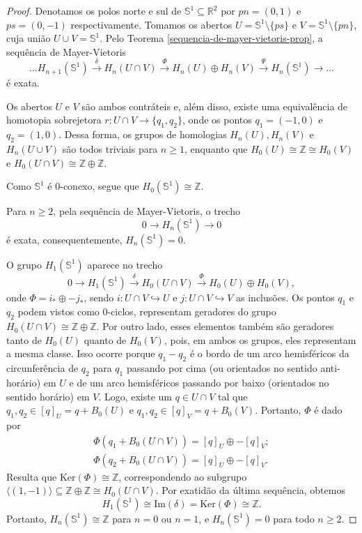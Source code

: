\begin{proof}
    Denotamos os polos norte e sul de $\mathbb{S}^1\subseteq \mathbb{R}^2$ por $pn=(0,1)$ e $ps=(0,-1)$ respectivamente. Tomamos os abertos $U=\mathbb{S}^1\setminus \{ps\}$ e $V=\mathbb{S}^1\setminus \{pn\}$, cuja união $U\cup V=\mathbb{S}^1$. Pelo Teorema \ref{sequencia-de-mayer-vietoris-prop}, a sequência de Mayer-Vietoris
    \[...H_{n+1}(\mathbb{S}^1)\xrightarrow{\delta} H_n(U\cap V)\xrightarrow{\Phi}H_n(U)\oplus H_n(V)\xrightarrow{\Psi} H_n(\mathbb{S}^1)\rightarrow ...\]
    é exata.

    Os abertos $U$ e $V$ são ambos contráteis e, além disso, existe uma equivalência de homotopia sobrejetora $r:U\cap V\rightarrow\{q_1,q_2\}$, onde os pontos $q_1=(-1,0)$ e $q_2=(1,0)$. Dessa forma, os grupos de homologias $H_n(U),H_n(V)$ e $H_n(U\cup V)$ são todos triviais para $n\ge 1$, enquanto que $H_0(U)\cong \mathbb{Z}\cong H_0 (V)$ e $H_0 (U\cap V)\cong \mathbb{Z}\oplus \mathbb{Z}$.

    Como $\mathbb{S}^1$ é 0-conexo, segue que $H_0(\mathbb{S}^1)\cong \mathbb{Z}$.

    Para $n\ge 2$, pela sequência de Mayer-Vietoris, o trecho  
    \[0\rightarrow H_n (\mathbb{S}^1)\rightarrow 0\]
    é exata, consequentemente, $H_n(\mathbb{S}^1)=0.$

    O grupo $H_1(\mathbb{S}^1)$ aparece no trecho 
    \[0\rightarrow H_1(\mathbb{S}^1)\xrightarrow{\delta} H_0 (U\cap V)\xrightarrow{\Phi} H_0(U)\oplus H_0 (V),\]
    onde $\Phi=i_*\oplus -j_*$, sendo $i:U\cap V\hookrightarrow U$ e $j:U\cap V\hookrightarrow V$ as inclusões. Os pontos $q_1$ e $q_2$ podem vistos como 0-ciclos, representam geradores do grupo $H_0(U\cap V)\cong \mathbb{Z}\oplus \mathbb{Z}$. Por outro lado, esses elementos também são geradores tanto de $H_0 (U)$ quanto de $H_0(V)$, pois, em ambos os grupos, eles representam a mesma classe. Isso ocorre porque $q_1-q_2$ é o bordo de um arco hemisféricos da circunferência de $q_2$ para $q_1$ passando por cima (ou orientados no sentido anti-horário) em $U$ e de um arco hemisféricos passando por baixo (orientados no sentido horário) em $V$. Logo, existe um $q\in U\cap V$ tal que $q_1,q_2\in [q]_U=q+B_0 (U)$ e $q_1,q_2\in [q]_V=q+B_0 (V)$. Portanto, $\Phi$ é dado por 
    \begin{align*}
        \Phi(q_1+B_0(U\cap V))=[q]_U\oplus-[q]_V;\\
        \Phi(q_2+B_0(U\cap V))=[q]_U\oplus -[q]_V.
    \end{align*}
    Resulta que $\text{Ker}(\Phi)\cong \mathbb{Z}$, correspondendo ao subgrupo $\langle (1,-1) \rangle\subseteq \mathbb{Z}\oplus \mathbb{Z}\cong H_0(U\cap V)$. Por exatidão da última sequência, obtemos 
    \[H_1(\mathbb{S}^1)\cong \text{Im}(\delta)=\text{Ker}(\Phi)\cong \mathbb{Z}.\]
    Portanto, $H_n(\mathbb{S}^1)\cong \mathbb{Z}$ para $n=0$ ou $n=1$, e $H_n(\mathbb{S}^1)=0$ para todo $n\ge 2$.
\end{proof}

